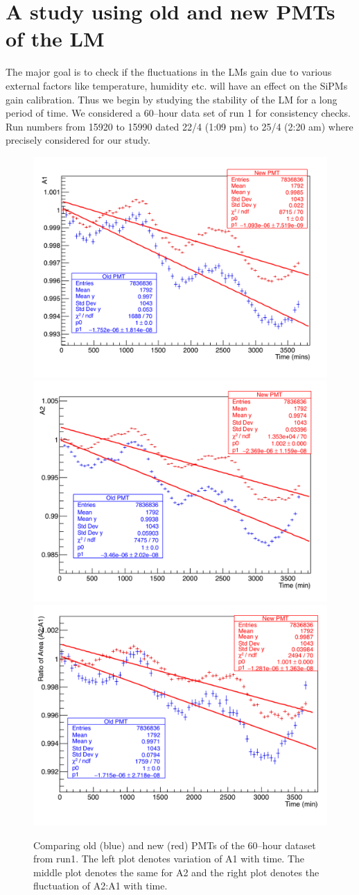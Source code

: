 \documentclass[article,accept,moreauthors,pdftex,10pt,a4paper]{Definitions/mdpi}
\begin{document}
 

\section{A study using old and new PMTs of the LM}
The major goal is to check if the fluctuations in the LMs gain due to various 
external factors like temperature, humidity etc. will have an effect on 
the SiPMs gain calibration. Thus we begin by studying the stability of the LM for a 
long period of time. We considered a 60--hour data set of run 1 for consistency checks.  
Run numbers from 15920 to 15990 dated 22/4 (1:09 pm) to 25/4 (2:20 am) 
where precisely considered for our study.  
\begin{figure}[H]
\centering
\includegraphics[width=5 cm]{calo20_a1_60hr.pdf}
\includegraphics[width=5 cm]{calo20_a2_60hr.pdf}
\includegraphics[width=5 cm]{calo20_a2_a1_60hr.pdf}
\caption{\label{fig2}Comparing old (blue) and new (red) PMTs of the 60--hour dataset from run1. The left plot 
denotes variation of A1 with time. The middle plot denotes the same for A2 and the right plot denotes 
the fluctuation of A2:A1 with time.}
\end{figure}  
\end{document}
